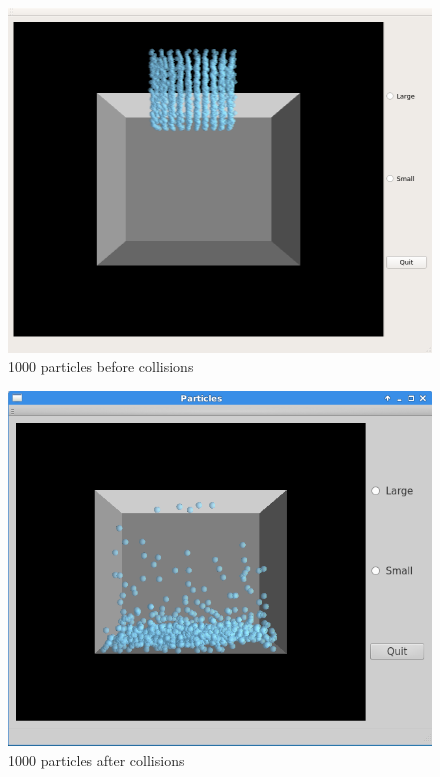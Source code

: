\begin{figure}[h]
  \caption{1000 particles before collisions}
  \includegraphics[width=\columnwidth,natwidth=2in,natwidth=3in]{image4.png}
\end{figure}
\begin{figure}[h]
  \caption{1000 particles after collisions}
  \includegraphics[width=\columnwidth,natwidth=2in,natwidth=3in]{image1.png}
\end{figure}
